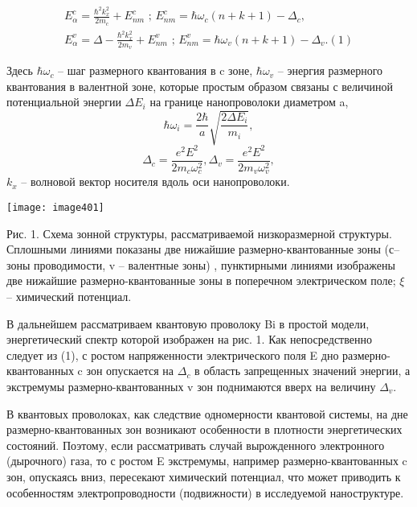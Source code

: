 \begin{equation} \label{eq:42_10}
\begin{aligned}
E_{\alpha }^{c} =\frac{\hbar ^{2} k_{x}^{2} }{2m_{c} } +E_{nm}^{c} \textbf{ ; } E_{nm}^{c} =\hbar \omega _{c} \left(n+k+1\right)-\Delta _{c} ,\\
E_{\alpha }^{v} =\Delta -\frac{\hbar ^{2} k_{x}^{2} }{2m_{v} } +E_{nm}^{v} \textbf{ ; } E_{nm}^{v} =\hbar \omega _{v} \left(n+k+1\right)-\Delta _{v} . (1)
\end{aligned}
\end{equation}


Здесь $\hbar \omega _{c} $ -- шаг размерного квантования в c зоне, $\hbar \omega _{v} $ -- энергия размерного квантования в валентной зоне, которые простым образом связаны с величиной потенциальной энергии $\Delta E_{i} $ на границе нанопроволоки диаметром a,
\[\hbar \omega _{i} =\frac{2\hbar }{a} \sqrt{\frac{2\Delta E_{i} }{m_{i} } } ,\] 
\[\Delta _{c} =\frac{e^{2} E^{2} }{2m_{c} \omega _{c}^{2} } , \Delta _{v} =\frac{e^{2} E^{2} }{2m_{v} \omega _{v}^{2} } ,\] 
$k_{x} $ -- волновой вектор носителя вдоль оси нанопроволоки.

\texttt{[image: image401]}

Рис. 1. Схема зонной структуры, рассматриваемой низкоразмерной структуры. Сплошными линиями показаны две нижайшие размерно-квантованные зоны (с-- зоны проводимости, v -- валентные зоны) , пунктирными линиями изображены две нижайшие размерно-квантованные зоны в поперечном электрическом поле; $\xi $ -- химический потенциал.

В дальнейшем рассматриваем квантовую проволоку Bi в простой модели, энергетический спектр которой изображен на рис. 1. Как непосредственно следует из (1), с ростом напряженности электрического поля E дно размерно-квантованных c зон опускается на $\Delta _{c} $ в область запрещенных значений энергии, а экстремумы размерно-квантованных v зон поднимаются вверх на величину $\Delta _{v} $.

В квантовых проволоках, как следствие одномерности квантовой системы, на дне размерно-квантованных зон возникают особенности в плотности энергетических состояний. Поэтому, если рассматривать случай вырожденного электронного (дырочного) газа, то с ростом E экстремумы, например размерно-квантованных c зон, опускаясь вниз, пересекают химический потенциал, что может приводить к особенностям электропроводности (подвижности) в исследуемой наноструктуре.

